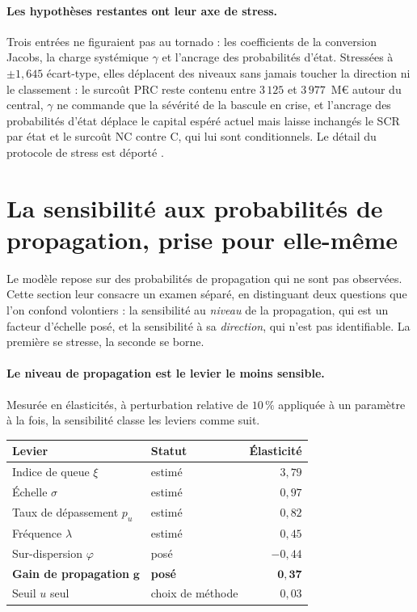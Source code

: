 \paragraph{Les hypothèses restantes ont leur axe de stress.} Trois entrées ne figuraient pas au
tornado : les coefficients de la conversion Jacobs, la charge systémique $\gamma$ et l'ancrage
des probabilités d'état. Stressées à $\pm 1{,}645$ écart-type, elles déplacent des niveaux sans
jamais toucher la direction ni le classement : le surcoût PRC reste contenu entre $3\,125$ et
$3\,977$~M\euro{} autour du central, $\gamma$ ne commande que la sévérité de la bascule en
crise, et l'ancrage des probabilités d'état déplace le capital espéré actuel mais laisse
inchangés le SCR par état et le surcoût NC contre C, qui lui sont conditionnels. Le détail du
protocole de stress est déporté \matcomp.

\section{La sensibilité aux probabilités de propagation, prise pour elle-même}
\label{sec:sensibilite-propagation}


Le modèle repose sur des probabilités de propagation qui ne sont pas observées. Cette section
leur consacre un examen séparé, en
distinguant deux questions que l'on confond volontiers : la sensibilité au \emph{niveau} de la
propagation, qui est un facteur d'échelle posé, et la sensibilité à sa \emph{direction}, qui
n'est pas identifiable. La première se stresse, la seconde se borne.

\paragraph{Le niveau de propagation est le levier le moins sensible.} Mesurée en élasticités, à
perturbation relative de $10\,\%$ appliquée à un paramètre à la fois, la sensibilité classe les
leviers comme suit.

\begin{center}\footnotesize
\renewcommand{\arraystretch}{1.15}
\begin{tabular}{@{}l l r@{}}
\toprule
\textbf{Levier} & \textbf{Statut} & \textbf{Élasticité} \\
\midrule
Indice de queue $\xi$ & estimé & $3{,}79$ \\
Échelle $\sigma$ & estimé & $0{,}97$ \\
Taux de dépassement $p_u$ & estimé & $0{,}82$ \\
Fréquence $\lambda$ & estimé & $0{,}45$ \\
Sur-dispersion $\varphi$ & posé & $-0{,}44$ \\
\textbf{Gain de propagation} $\boldsymbol{g}$ & \textbf{posé} & $\mathbf{0{,}37}$ \\
Seuil $u$ seul & choix de méthode & $0{,}03$ \\
\bottomrule
\end{tabular}
\end{center}

